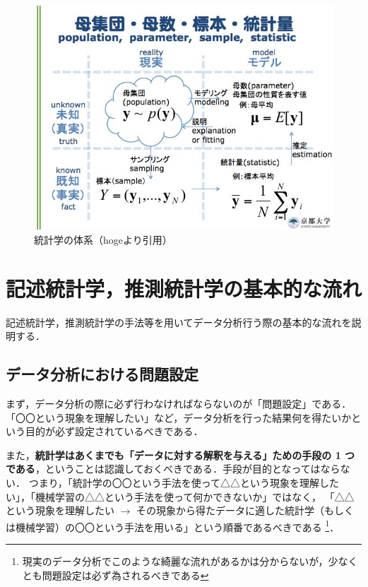\begin{figure}[H]
  \begin{center}
    \includegraphics[width=15cm]{images/parts/1/statistics_map.jpeg}
    \caption{統計学の体系（hogeより引用）}
  \end{center}
\end{figure}

\section{記述統計学，推測統計学の基本的な流れ}

記述統計学，推測統計学の手法等を用いてデータ分析行う際の基本的な流れを説明する．

\subsection{データ分析における問題設定} %
\label{sub:データ分析における問題設定}

まず，データ分析の際に必ず行わなければならないのが「問題設定」である．
「〇〇という現象を理解したい」など，データ分析を行った結果何を得たいかという目的が必ず設定されているべきである．

また，\textbf{統計学はあくまでも「データに対する解釈を与える」ための手段の 1 つである}，ということは認識しておくべきである．手段が目的となってはならない．
つまり，「統計学の〇〇という手法を使って△△という現象を理解したい」，「機械学習の△△という手法を使って何かできないか」ではなく，
「△△という現象を理解したい $\rightarrow$ その現象から得たデータに適した統計学（もしくは機械学習）の〇〇という手法を用いる」という順番であるべきである
\footnote{現実のデータ分析でこのような綺麗な流れがあるかは分からないが，少なくとも問題設定は必ず為されるべきである}．\\

